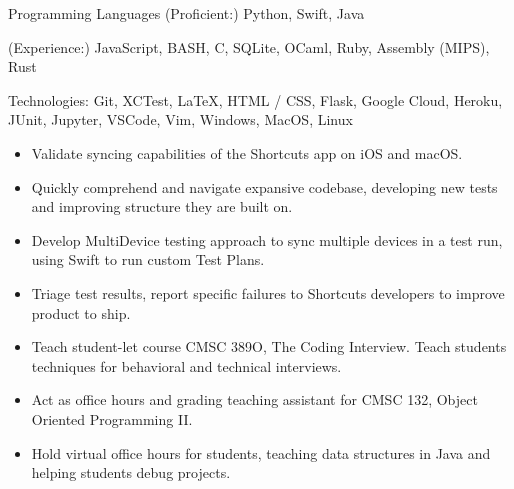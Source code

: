 \documentclass[11pt]{article}
\begin{document}
\setlength\topsep{0pt}
{\fontsize{10}{12}\robotocondlight
    {\robotocond Programming Languages (Proficient:)} Python, Swift, Java \par
    {\robotocond (Experience:)} JavaScript, BASH, C, SQLite, OCaml, Ruby, Assembly (MIPS), Rust \par
    {\robotocond Technologies:}
    Git, XCTest, \LaTeX, HTML / CSS, Flask, Google Cloud, Heroku, JUnit, Jupyter, VSCode, Vim, Windows, MacOS, Linux \par
}

\vspace{5mm}
\vspace{2mm}
{\fontsize{10}{12}\robotocondlight
    \begin{itemize}[noitemsep,nolistsep,leftmargin=30pt]
        \item Validate syncing capabilities of the Shortcuts app on iOS and macOS. 
        \item Quickly comprehend and navigate expansive codebase, developing new tests and improving structure they are built on. 
        \item Develop MultiDevice testing approach to sync multiple devices in a test run, using Swift to run custom Test Plans.
        \item Triage test results, report specific failures to Shortcuts developers to improve product to ship.
    \end{itemize}
    \vspace{3mm}
    \hspace{15pt}
    \begin{itemize}[noitemsep,nolistsep,leftmargin=30pt]
        \item Teach student-let course CMSC 389O, The Coding Interview. Teach students techniques for behavioral and technical interviews. 
        \item Act as office hours and grading teaching assistant for CMSC 132, Object Oriented Programming II.
        \item Hold virtual office hours for students, teaching data structures in Java and helping students debug projects.
    \end{itemize}
    \vspace{3mm}

}
\end{document}
